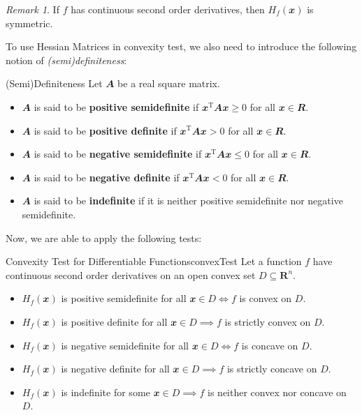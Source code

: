 \documentclass[math]{amznotes}
\theoremstyle{remark}
\newtheorem*{remark}{Remark}
\begin{document}
\begin{notebox}
    \begin{remark}
        If $f$ has continuous second order derivatives, then $H_f(\mathbfit{x})$ is symmetric.
    \end{remark}
\end{notebox}
To use Hessian Matrices in convexity test, we also need to introduce the following notion of \textit{(semi)definiteness}:
\begin{dfnbox}{(Semi)Definiteness}
    Let $\mathbfit{A}$ be a real square matrix.
    \begin{itemize}
        \item $\mathbfit{A}$ is said to be {\color{red} \textbf{positive semidefinite}} if $\mathbfit{x}^{\mathrm{T}}\mathbfit{Ax} \geq 0$ for all $\mathbfit{x} \in \mathbfit{R}$.
        \item $\mathbfit{A}$ is said to be {\color{red} \textbf{positive definite}} if $\mathbfit{x}^{\mathrm{T}}\mathbfit{Ax} > 0$ for all $\mathbfit{x} \in \mathbfit{R}$.
        \item $\mathbfit{A}$ is said to be {\color{red} \textbf{negative semidefinite}} if $\mathbfit{x}^{\mathrm{T}}\mathbfit{Ax} \leq 0$ for all $\mathbfit{x} \in \mathbfit{R}$.
        \item $\mathbfit{A}$ is said to be {\color{red} \textbf{negative definite}} if $\mathbfit{x}^{\mathrm{T}}\mathbfit{Ax} < 0$ for all $\mathbfit{x} \in \mathbfit{R}$.
        \item $\mathbfit{A}$ is said to be {\color{red} \textbf{indefinite}} if it is neither positive semidefinite nor negative semidefinite.
    \end{itemize}
\end{dfnbox}
Now, we are able to apply the following tests:
\begin{thmbox}{Convexity Test for Differentiable Functions}{convexTest}
    Let a function $f$ have continuous second order derivatives on an open convex set $D \subseteq \mathbf{R}^n$.
    \begin{itemize}
        \item $H_f(\mathbfit{x})$ is positive semidefinite for all $\mathbfit{x} \in D \iff f$ is convex on $D$.
        \item $H_f(\mathbfit{x})$ is positive definite for all $\mathbfit{x} \in D \implies f$ is strictly convex on $D$.
        \item $H_f(\mathbfit{x})$ is negative semidefinite for all $\mathbfit{x} \in D \iff f$ is concave on $D$.
        \item $H_f(\mathbfit{x})$ is negative definite for all $\mathbfit{x} \in D \implies f$ is strictly concave on $D$.
        \item $H_f(\mathbfit{x})$ is indefinite for some $\mathbfit{x} \in D \implies f$ is neither convex nor concave on $D$.
    \end{itemize}
\end{thmbox}
\end{document}
